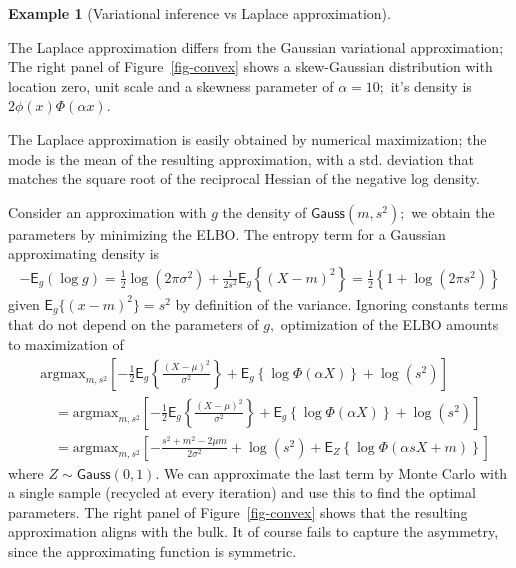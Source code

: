 \documentclass[
  11pt,
  letterpaper,
]{scrbook}
\theoremstyle{plain}
\theoremstyle{plain}
\theoremstyle{definition}
\theoremstyle{definition}
\theoremstyle{definition}
\newtheorem{example}{Example}[chapter]
\theoremstyle{plain}
\theoremstyle{remark}
\begin{document}
\begin{example}[Variational inference vs Laplace
approximation]\protect\hypertarget{exm-varional-vs-laplace}{}\label{exm-varional-vs-laplace}

The Laplace approximation differs from the Gaussian variational
approximation; The right panel of Figure~\ref{fig-convex} shows a
skew-Gaussian distribution with location zero, unit scale and a skewness
parameter of \(\alpha=10;\) it's density is \(2\phi(x)\Phi(\alpha x).\)

The Laplace approximation is easily obtained by numerical maximization;
the mode is the mean of the resulting approximation, with a std.
deviation that matches the square root of the reciprocal Hessian of the
negative log density.

Consider an approximation with \(g\) the density of
\(\mathsf{Gauss}(m, s^2);\) we obtain the parameters by minimizing the
ELBO. The entropy term for a Gaussian approximating density is
\begin{align*}
-\mathsf{E}_g(\log g) = \frac{1}{2}\log(2\pi \sigma^2) + \frac{1}{2s^2}\mathsf{E}_g\left\{(X-m)^2 \right\} = \frac{1}{2} \left\{1+\log(2\pi s^2)\right\}
\end{align*} given \(\mathsf{E}_g\{(x-m)^2\}=s^2\) by definition of the
variance. Ignoring constants terms that do not depend on the parameters
of \(g,\) optimization of the ELBO amounts to maximization of
\begin{align*}
&\mathrm{argmax}_{m, s^2} \left[-\frac{1}{2} \mathsf{E}_g \left\{ \frac{(X-\mu)^2}{\sigma^2}\right\} + \mathsf{E}_g\left\{\log \Phi(\alpha X)\right\} + \log(s^2) \right] \\
&\quad =\mathrm{argmax}_{m, s^2} \left[ -\frac{1}{2} \mathsf{E}_g \left\{ \frac{(X-\mu)^2}{\sigma^2}\right\} + \mathsf{E}_g\left\{\log \Phi(\alpha X)\right\} + \log(s^2) \right]
\\&\quad =\mathrm{argmax}_{m, s^2} \left[ -\frac{s^2 + m^2 -2\mu m}{2\sigma^2} + \log(s^2) + \mathsf{E}_{Z}\left\{\log \Phi(\alpha sX+m)\right\} \right]
\end{align*} where \(Z \sim \mathsf{Gauss}(0,1).\) We can approximate
the last term by Monte Carlo with a single sample (recycled at every
iteration) and use this to find the optimal parameters. The right panel
of Figure~\ref{fig-convex} shows that the resulting approximation aligns
with the bulk. It of course fails to capture the asymmetry, since the
approximating function is symmetric.

\end{example}
\end{document}
